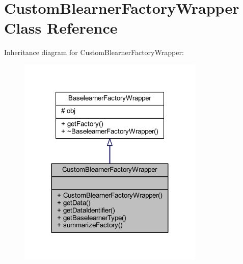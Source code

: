 \hypertarget{class_custom_blearner_factory_wrapper}{}\section{Custom\+Blearner\+Factory\+Wrapper Class Reference}
\label{class_custom_blearner_factory_wrapper}


Inheritance diagram for Custom\+Blearner\+Factory\+Wrapper\+:\nopagebreak
\begin{figure}[H]
\begin{center}
\leavevmode
\includegraphics[width=251pt]{class_custom_blearner_factory_wrapper__inherit__graph}
\end{center}
\end{figure}


